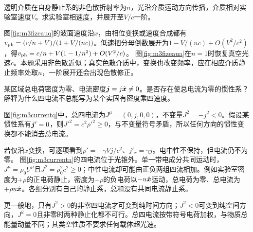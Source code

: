 \begin{exercise}\label{ex:m3fizeau}
透明介质在自身静止系的非色散折射率为$n$，光沿介质运动方向传播，介质相对实验室速度$V$。求实验室相速度，并展开至$V/c$一阶。
\end{exercise}
\begin{solution}
图\ref{fig:m3fizeauq}的波面速度沿$x$，由相位变换或速度合成都有$v_{\rm ph}=(c/n+V)/(1+V/(nc))$。低速把分母倒数展开为$1-V/(nc)+O(V^2/c^2)$，得$v_{\rm ph}=c/n+V(1-1/n^2)+O(V^2/c)$。
图\ref{fig:m3fizeaua}在$n=1$时恢复真空光速$c$。本题采用非色散近似；真实色散介质中，变换也改变频率，应在相应介质静止频率处取$n$，一阶展开还会出现色散修正。
\end{solution}

\begin{exercise}\label{ex:m3currentrest}
某区域总电荷密度为零、电流密度$\bm{j}=j\hat{\bm{x}}\ne0$。是否存在使总电流为零的惯性系？解释为什么四电流不总能写为某个实固有密度乘四速度。
\end{exercise}
\begin{solution}
图\ref{fig:m3currentq}中，总四电流为$J^\mu=(0,j,0,0)$，不变量$J^2=-j^2<0$。假设某惯性系有$\bm{j}'=0$，则$J'^2=c^2\rho'^2\geq0$，与不变量符号矛盾，所以任何方向的惯性变换都不能消去总电流。

若仅沿$x$变换，可逐项看到$\rho'=-\gamma Vj/c^2$、$j'_x=\gamma j$。电中性不保持，但电流仍不为零。
图\ref{fig:m3currenta}的四电流位于光锥外。单一带电成分共同运动时，$J^\mu=\rho_0U^\mu$且$J^2=\rho_0^2c^2\geq0$；中性电流却可能由正负两组四流相加。例如实验室密度为$+\rho$的正电荷静止，密度为$-\rho$的负电荷以$-u\hat{\bm{x}}$运动，总电荷为零、总电流为$+\rho u\hat{\bm{x}}$。各组分别有自己的静止系，总和没有共同电流静止系。

更一般地，只有$J^2>0$的非零四电流才可变到纯时间方向；$J^2<0$可变到纯空间方向，$J^2=0$且非零时两种静止化都不可行。总四电流按带符号电荷加权，与物质总能量动量不同；其类空性质不要求任何载体超光速。
\end{solution}

